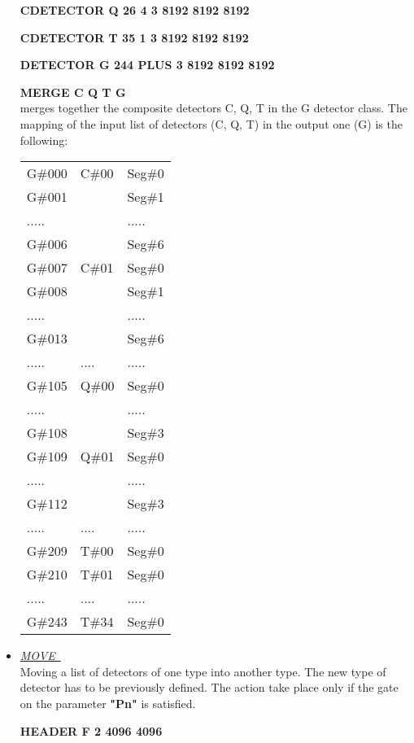 \begin{itemize}
	\hskip1cm{\bf CDETECTOR Q 26 4 3 8192 8192 8192}

	\hskip1cm{\bf CDETECTOR T 35 1 3 8192 8192 8192}

	\hskip1cm{\bf DETECTOR  G 244 PLUS 3 8192 8192 8192}

	\hskip1cm{\bf MERGE C Q T G}\\
	merges together the composite detectors C, Q, T in the G detector
	class. The mapping of the input list of detectors (C, Q, T) in the
output one (G) is the following: \\
\begin{center}
\begin{tabular}{lll}
	G\#000 & C\#00 & Seg\#0 \\
	G\#001 &      & Seg\#1 \\
	..... &      & ..... \\
	G\#006 &      & Seg\#6 \\
	G\#007 & C\#01 & Seg\#0 \\
	G\#008 &      & Seg\#1 \\
	..... &      & ..... \\
	G\#013 &      & Seg\#6 \\
	..... & .... & ..... \\
	G\#105 & Q\#00 & Seg\#0 \\
	..... &      & ..... \\
	G\#108 &      & Seg\#3 \\
	G\#109 & Q\#01 & Seg\#0 \\
	..... &      & ..... \\
	G\#112 &      & Seg\#3 \\
	..... & .... & ..... \\
	G\#209 & T\#00 & Seg\#0 \\
	G\#210 & T\#01 & Seg\#0 \\
	..... & .... & ..... \\
	G\#243 & T\#34 & Seg\#0 \\
\end{tabular}
\end{center}

 \item	{\it\underline{MOVE~}}\footnotemark[3] \\

	Moving a list of detectors of one type into another type. The
	new type of detector has to be previously defined.
	The action take place only if the gate on the parameter {\bf "Pn"} is
	satisfied.

	\hskip1cm{\bf HEADER F 2 4096 4096}


\end{itemize}
